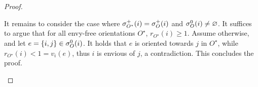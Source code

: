 \begin{proof}
\begin{nestedproof}
        It remains to consider the case where $\sigma^+_{O^\star}(i) = \sigma^+_O(i)$ and $\sigma^0_O(i) \neq \varnothing$.
        It suffices to argue that for all envy-free orientations $O^\star$, $r_{O^\star}(i) \ge 1$.
            Assume otherwise, and let $e = \{ i, j \} \in \sigma^0_O(i)$.
        It holds that $e$ is oriented towards $j$ in $O^\star$, while $r_{O^\star}(i) < 1 = v_i(e)$,
        thus $i$ is envious of $j$, a contradiction.
        This concludes the proof.
%
%

\end{nestedproof}
\end{proof}
